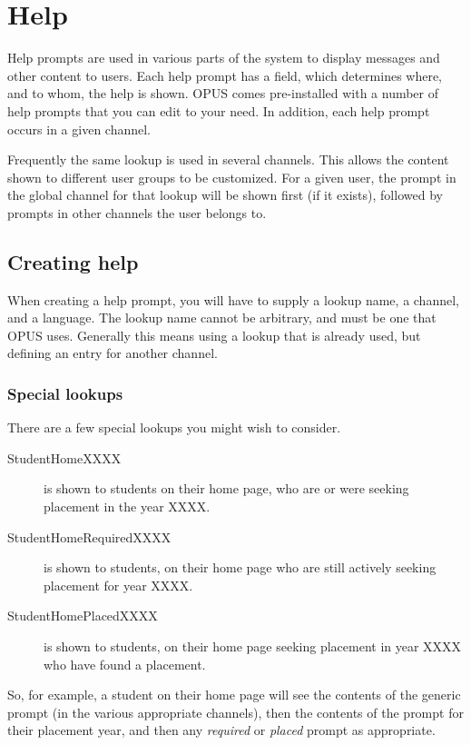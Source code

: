 \documentclass[12 pt]{book}
\begin{document}
\section{Help}
\label{Help}

Help prompts are used in various parts of the system to display messages
and other content to users. Each help prompt has a  field,
which determines where, and to whom, the help is shown. OPUS comes
pre-installed with a number of help prompts that you can edit to your
need. In addition, each help prompt occurs in a given channel.

Frequently the same lookup is used in several channels. This allows the
content shown to different user groups to be customized. For a given
user, the prompt in the global channel for that lookup will be shown first
(if it exists), followed by prompts in other channels the user belongs to.

\subsection{Creating help}

When creating a help prompt, you will have to supply a lookup name, a
channel, and a language. The lookup name cannot be arbitrary, and must
be one that OPUS uses. Generally this means using a lookup that is
already used, but defining an entry for another channel.

\subsubsection{Special lookups}

There are a few special lookups you might wish to consider.

\begin{description}
  \item[StudentHomeXXXX] is shown to students on their home page, 
  who are or were seeking placement in the year XXXX.
  \item[StudentHomeRequiredXXXX] is shown to students, on their home
  page who are still actively seeking placement for year XXXX.
  \item[StudentHomePlacedXXXX] is shown to students, on their home
  page seeking placement in year XXXX who have found a placement.
\end{description}

So, for example, a student on their home page will see the contents
of the generic  prompt (in the various appropriate
channels), then the contents of the  prompt
for their placement year, and then any \emph{required} or \emph{placed}
prompt as appropriate.
\end{document}
